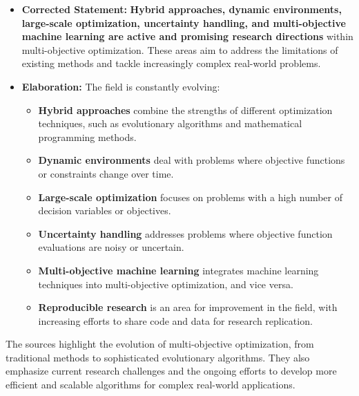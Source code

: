 \documentclass[
]{article}
\begin{document}
\begin{itemize}
  \begin{itemize}
  
  \item
    \textbf{Corrected Statement:} \textbf{Hybrid approaches, dynamic
    environments, large-scale optimization, uncertainty handling, and
    multi-objective machine learning are active and promising research
    directions} within multi-objective optimization. These areas aim to
    address the limitations of existing methods and tackle increasingly
    complex real-world problems.
  \item
    \textbf{Elaboration:} The field is constantly evolving:

    \begin{itemize}
    
    \item
      \textbf{Hybrid approaches} combine the strengths of different
      optimization techniques, such as evolutionary algorithms and
      mathematical programming methods.
    \item
      \textbf{Dynamic environments} deal with problems where objective
      functions or constraints change over time.
    \item
      \textbf{Large-scale optimization} focuses on problems with a high
      number of decision variables or objectives.
    \item
      \textbf{Uncertainty handling} addresses problems where objective
      function evaluations are noisy or uncertain.
    \item
      \textbf{Multi-objective machine learning} integrates machine
      learning techniques into multi-objective optimization, and vice
      versa.
    \item
      \textbf{Reproducible research} is an area for improvement in the
      field, with increasing efforts to share code and data for research
      replication.
    \end{itemize}
  \end{itemize}
\end{itemize}

The sources highlight the evolution of multi-objective optimization,
from traditional methods to sophisticated evolutionary algorithms. They
also emphasize current research challenges and the ongoing efforts to
develop more efficient and scalable algorithms for complex real-world
applications.
\end{document}
